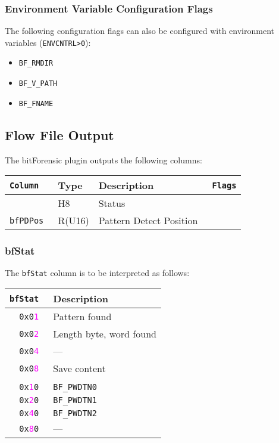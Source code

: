 \documentclass[documentation]{subfiles}
\begin{document}
\subsubsection{Environment Variable Configuration Flags}
The following configuration flags can also be configured with environment variables ({\tt ENVCNTRL>0}):
\begin{itemize}
    \item {\tt BF\_RMDIR}
    \item {\tt BF\_V\_PATH}
    \item {\tt BF\_FNAME}
\end{itemize}

\subsection{Flow File Output}
The bitForensic plugin outputs the following columns:
\begin{longtable}{>{\tt}lll>{\tt\small}l}
    \toprule
    {\bf Column} & {\bf Type} & {\bf Description} & {\bf Flags}\\
    \midrule\endhead%
    \nameref{bfStat} & H8     & Status                  & \\
    bfPDPos          & R(U16) & Pattern Detect Position & \\
    \bottomrule
\end{longtable}

\subsubsection{bfStat}\label{bfStat}
The {\tt bfStat} column is to be interpreted as follows:
\begin{longtable}{>{\tt}rl}
    \toprule
    {\bf bfStat} & {\bf Description}\\
    \midrule\endhead%
    0x0\textcolor{magenta}{1} & Pattern found           \\
    0x0\textcolor{magenta}{2} & Length byte, word found \\
    0x0\textcolor{magenta}{4} & ---                     \\
    0x0\textcolor{magenta}{8} & Save content            \\
    \\
    0x\textcolor{magenta}{1}0 & {\tt BF\_PWDTN0}        \\
    0x\textcolor{magenta}{2}0 & {\tt BF\_PWDTN1}        \\
    0x\textcolor{magenta}{4}0 & {\tt BF\_PWDTN2}        \\
    0x\textcolor{magenta}{8}0 & ---                     \\
    \bottomrule
\end{longtable}
\end{document}
